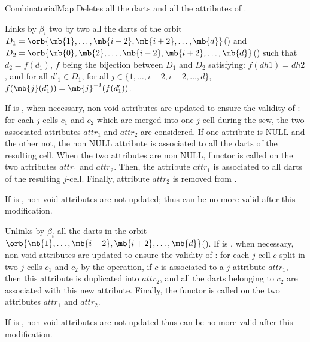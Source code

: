 \begin{ccRefConcept}{CombinatorialMap}
   {Deletes all the darts and all the attributes of .}
\ccOperations

 {Links by $\beta_i$
  two by two all the darts of the orbit
  $D_1=\orb{\mb{1},\ldots,\mb{i-2},\mb{i+2},\ldots,\mb{d}}$() and
  $D_2=\orb{\mb{0},\mb{2},\ldots,\mb{i-2},\mb{i+2},\ldots,\mb{d}}$()
  such that $d_2=f(d_1)$, $f$ being the bijection between $D_1$ and $D_2$ 
  satisfying: $f(dh1)=dh2$, and for all $d'_1 \in D_1$, for all $j\in
  \{1,\ldots,i-2,i+2,\ldots,d\}$,
  $f(\mb{j}(d'_1))=\mb{j}^{-1}(f(d'_1))$.

  If  is , when necessary, non void
  attributes are updated to ensure the validity of : for each
  $j$-cells $c_1$ and $c_2$ which are merged into one $j$-cell during
  the sew, the two associated attributes $attr_1$ and $attr_2$ are
  considered.  If one attribute is
  NULL and the other not, the non NULL attribute is associated to all
  the darts of the resulting cell.  When the two attributes are non
  NULL, functor  is called on
  the two attributes $attr_1$ and $attr_2$. Then, the attribute
  $attr_1$ is associated to all darts of the resulting
  $j$-cell. Finally, attribute $attr_2$ is removed from .
  \begin{ccAdvanced}
    If  is , non void attributes are
    not updated; thus  can be no more valid after this
    modification.
  \end{ccAdvanced}
}

 {Unlinks by $\beta_i$ all the darts in the
  orbit
  $\orb{\mb{1},\ldots,\mb{i-2},\mb{i+2},\ldots,\mb{d}}$().  If
   is , when necessary, non void
  attributes are updated to ensure the validity of : for each
  $j$-cell $c$ split in two $j$-cells $c_1$ and $c_2$ by the
  operation, if $c$ is associated to a $j$-attribute $attr_1$, then
  this attribute is duplicated into $attr_2$, and all the darts
  belonging to $c_2$ are associated with this new attribute.  Finally,
  the functor  is called on the
  two attributes $attr_1$ and $attr_2$.
\begin{ccAdvanced}
  If  is , non void attributes are
  not updated thus  can be no more valid after this
  modification. 
\end{ccAdvanced}}


\end{ccRefConcept}
